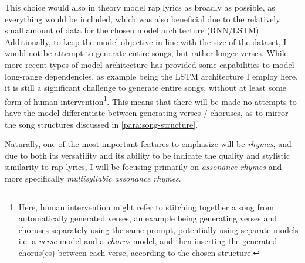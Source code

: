This choice would also in theory model rap lyrics as broadly as possible, as everything would be included, which was also beneficial due to the relatively small amount of data for the chosen model architecture (RNN/LSTM). Additionally, to keep the model objective in line with the size of the dataset, I would not be attempt to generate entire songs, but rather longer verses. While more recent types of model architecture has provided some capabilities to model long-range dependencies, as example being the LSTM architecture I employ here, it is still a significant challenge to generate entire songs, without at least some form of human intervention\footnote{Here, human intervention might refer to stitching together a song from automatically generated verses, an example being generating verses and choruses separately using the same prompt, potentially using separate models i.e. a \textit{verse}-model and a \textit{chorus}-model, and then inserting the generated chorus(es) between each verse, according to the chosen \hyperref[para:song-structure]{structure}.}. This means that there will be made no attempts to have the model differentiate between generating verses / choruses, as to mirror the song structures discussed in \cref{para:song-structure}.

Naturally, one of the most important features to emphasize will be \textit{rhymes}, and due to both its versatility and its ability to be indicate the quality and stylistic similarity to rap lyrics, I will be focusing primarily on \textit{assonance rhymes} and more specifically \textit{multisyllabic assonance rhymes}.